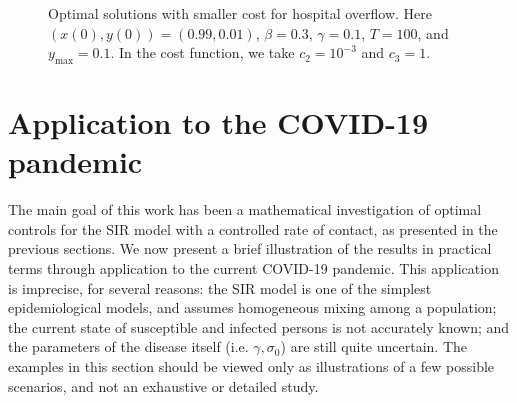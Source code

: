 \documentclass[english,12pt,letter]{article}
\newcommand{\Rnot}{\sigma_0}
\newcommand{\ymax}{y_\text{max}}
\begin{document}
\begin{figure}
    \centering
    \caption{Optimal solutions with smaller cost for hospital overflow.  Here $(x(0),y(0)) = (0.99,0.01)$, $\beta=0.3$, $\gamma=0.1$, $T=100$,
        and $\ymax=0.1$.
        In the cost function, we take $c_2=10^{-3}$ and $c_3=1$.\label{fig:min_hosp_2}}
\end{figure}

\section{Application to the COVID-19 pandemic\label{sec:application}}
The main goal of this work has been a mathematical investigation of optimal
controls for the SIR model with a controlled rate of contact, as presented
in the previous sections.  We now present a brief illustration of the results
in practical terms through application to the current COVID-19 pandemic.
This application is imprecise, for several reasons:  the SIR model
is one of the simplest epidemiological models, and assumes homogeneous mixing
among a population; the current state of susceptible and infected persons is
not accurately known; and the parameters of the disease itself (i.e. $\gamma, \Rnot$)
are still quite uncertain.  
The examples in this section should be viewed only as illustrations
of a few possible scenarios, and not an exhaustive or detailed study.
\end{document}
